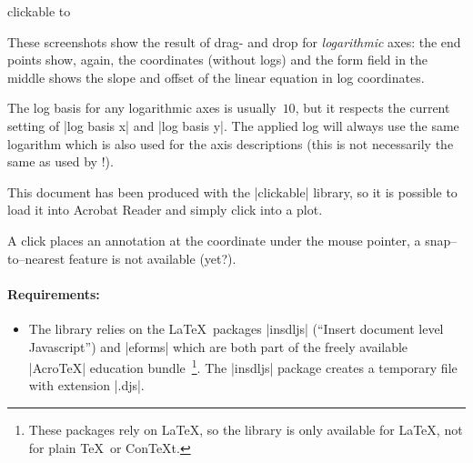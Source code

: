 \begin{pgfplotslibrary}{clickable}
	\noindent
	\hbox to %

	\nobreak
	These screenshots show the result of drag- and drop for \emph{logarithmic} axes: the end points show, again, the coordinates (without logs) and the form field in the middle shows the slope and offset of the linear equation in log coordinates.

	The log basis for any logarithmic axes is usually~$10$, but it respects the current setting of |log basis x| and |log basis y|. The applied log will always use the same logarithm which is also used for the axis descriptions (this is not necessarily the same as used by \PGFPlotstable!).

	This document has been produced with the |clickable| library, so it is possible to load it into Acrobat Reader and simply click into a plot.

	A click places an annotation at the coordinate under the mouse pointer, a snap--to--nearest feature is not available (yet?).

	\paragraph{Requirements:}
	\begin{itemize}
		\item The library relies on the \LaTeX\ packages |insdljs| (``Insert document level Javascript'') and |eforms| which are both part of the freely available |AcroTeX| education bundle~\cite{acrotex}\footnote{These packages rely on \LaTeX, so the library is only available for \LaTeX, not for plain \TeX\ or Con\TeX t.}. The |insdljs| package creates a temporary file with extension |.djs|.
		

\end{itemize}
\end{pgfplotslibrary}
